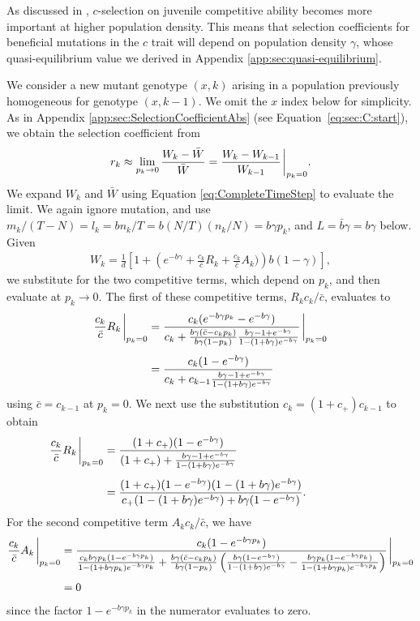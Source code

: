 \documentclass[9pt,twocolumn,twoside,lineno]{gsajnl}
\begin{document}
As discussed in \citet[][section 3.2]{bertram2019density}, $c$-selection on juvenile competitive ability becomes more important at higher population density. This means that selection coefficients for beneficial mutations in the $c$ trait will depend on population density $\gamma$, whose quasi-equilibrium value we derived in Appendix \ref{app:sec:quasi-equilibrium}.

We consider a new mutant genotype $(x,k)$ arising in a population previously homogeneous for genotype $(x,k-1)$. We omit the $x$ index below for simplicity. As in Appendix \ref{app:sec:SelectionCoefficientAbs} (see Equation~\eqref{eq:sec:C:start}), we obtain the selection coefficient from
\[
r_k \approx \lim_{p_k\rightarrow 0} \frac{W_k-\bar{W}}{\bar{W}} = \frac{W_k-W_{k-1}}{W_{k-1}}\eval_{p_k=0}.
\]
We expand $W_k$ and $\bar{W}$ using Equation \eqref{eq:CompleteTimeStep} to evaluate the limit. We again ignore mutation, and use $m_k/(T-N)=l_k = bn_k/T = b(N/T)(n_k/N) = b\gamma p_k$, and $L=\bar{b}\gamma = b\gamma$ below. Given 
\[
\begin{aligned}
W_k = \frac{1}{d}\left[1+\left(e^{-b\gamma} +\frac{c_k}{\bar{c}}R_k+ \frac{c_k}{\bar{c}}A_k)\right)b(1-\gamma)\right],
\end{aligned}
\]
we substitute for the two competitive terms, which depend on $p_k$, and then evaluate at $p_k\rightarrow 0$. The first of these competitive terms, $R_k c_k/\bar{c}$, evaluates to
\[
\begin{aligned}
\frac{c_k}{\bar{c}} R_k\eval_{p_k=0} &= 
\frac{c_k(e^{-b\gamma p_k}-e^{-b\gamma})}{c_k +\frac{b\gamma (\bar{c}-c_k p_k)}{b\gamma (1-p_k)}\frac{b\gamma-1+e^{-b\gamma}}{1-(1+b\gamma)e^{-b\gamma}}}\eval_{p_k=0} \\[4pt]
&= \frac{c_k(1-e^{-b\gamma})}{c_k +c_{k-1}\frac{b\gamma-1+e^{-b\gamma}}{1-(1+b\gamma)e^{-b\gamma}}} 
\end{aligned}
\]
using $\bar{c}=c_{k-1}$ at $p_k=0$. We next use the substitution $c_k = (1+c_+)c_{k-1}$ to obtain
\[
\begin{aligned}
\frac{c_k}{\bar{c}}R_k\eval_{p_k=0}&= \frac{(1+c_+)(1-e^{-b\gamma})}{(1+c_+) +\frac{b\gamma-1+e^{-b\gamma}}{1-(1+b\gamma)e^{-b\gamma}}} \\[4pt]
&= \frac{(1+c_+)(1-e^{-b\gamma})(1-(1+b\gamma)e^{-b\gamma})}{c_+(1-(1+b\gamma)e^{-b\gamma}) + b\gamma(1-e^{-b\gamma})}.\hspace{.8in}
\end{aligned}
\]
For the second competitive term $A_k c_k/\bar{c}$, we have
\[
\begin{aligned}
\frac{c_k}{\bar{c}}A_k\eval_{p_k=0} &=  \frac{c_k(1-e^{-b\gamma p_k})}{ \frac{c_kb\gamma p_k(1-e^{-b\gamma p_k})}{1-(1+b\gamma p_k)e^{-b\gamma p_k}}+\frac{b\gamma(\bar{c}-c_kp_k)}{b\gamma(1-p_{k})}\left(\frac{b\gamma(1-e^{-b\gamma})}{1-(1+b\gamma)e^{-b\gamma}}-\frac{b\gamma p_{k}(1-e^{-b\gamma p_{k}})}{1-(1+b\gamma p_{k})e^{-b\gamma p_{k}}}\right)}\eval_{p_k=0}\\[4pt]
&=  0
\end{aligned}
\]
since the factor $1-e^{-b\gamma p_k}$ in the numerator evaluates to zero. 
\end{document}
